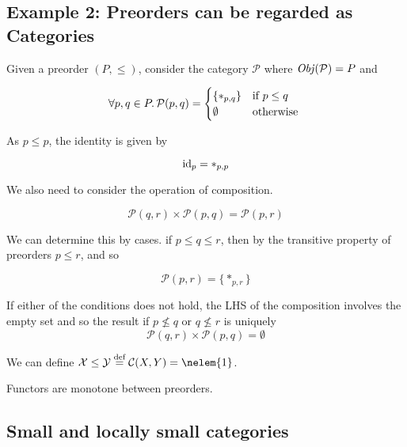 \subsection{Example 2: Preorders can be regarded as Categories}
\begin{example}

Given a preorder $(P, \leq)$, consider the category $\mathcal P$
where $\operatorname{\mathit{Obj}}(\mathcal P) = P$ and

\begin{equation*}
\forall p,q \in P  \ldotp \mathcal{P}(p, q) = \begin{cases}
    \{\ast_{p,q}\} & \text{if } p \leq q\\
    \emptyset & \text{otherwise }
\end{cases}
\end{equation*}

As $p \leq p$, the identity is given by

\begin{equation*}
\mathrm{id}_{ p } = \ast_{p,p}
\end{equation*}

We also need to consider the operation of composition.

\begin{equation*}
\mathcal{P}(q, r) \times \mathcal{P}(p, q) = \mathcal{P}(p, r)
\end{equation*}

We can determine this by cases. if $p \leq q \leq r$, then by the transitive
property of preorders $p \leq r$, and so

\begin{equation*}
\mathcal{P}(p, r) = \{\ast_{p,r}\}
\end{equation*}

If either of the conditions does not hold, the LHS of the composition involves
the empty set and so the result if $p \nleq q$ or $q \nleq r$ is uniquely
\begin{equation*}
\mathcal{P}(q, r) \times \mathcal{P}(p, q) = \emptyset
\end{equation*}

We can define $\mathcal{X}\leq \mathcal{Y} \eqdef \mathcal{C}(X, Y) = \nelem{1}$.

Functors are monotone between preorders.
\end{example}

\subsection{Small and locally small categories}

